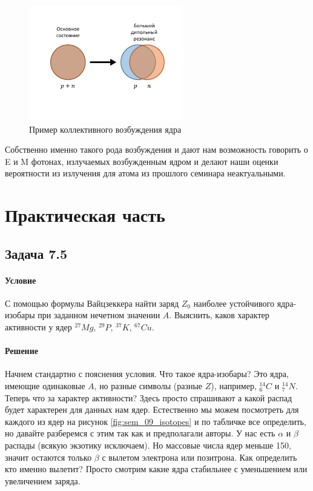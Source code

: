 \documentclass[12pt]{article}
\begin{document}
\begin{figure}[H]
    \centering
    \includegraphics[width=0.6\textwidth,keepaspectratio]{Seminar_09/pics/pic_dipole_resonance.pdf}
    \caption{Пример коллективного возбуждения ядра}
    \label{fig:sem_09_dipole_res}
\end{figure}
Собственно именно такого рода возбуждения и дают нам возможность говорить о E и M фотонах, излучаемых  возбужденным ядром и делают наши оценки вероятности из излучения для атома из прошлого семинара неактуальными.

\section{Практическая часть}
\subsection{Задача 7.5}
\label{task_}
\paragraph{Условие}
С помощью формулы Вайцзеккера найти заряд $Z_0$ наиболее устойчивого ядра-изобары при заданном нечетном значении $A$. Выяснить, каков характер активности у ядер $^{27}Mg$, $^{29}P$, $^{37}K$, $^{67}Cu$.
\paragraph{Решение}
Начнем стандартно с пояснения условия. Что такое ядра-изобары? Это ядра, имеющие одинаковые $A$, но разные символы (разные $Z$), например, $^{14}_6C$ и $ ^{14}_7N$. Теперь что за характер активности? Здесь просто спрашивают а какой распад будет характерен для данных нам ядер. Естественно мы можем посмотреть для каждого из ядер на рисунок \ref{fig:sem_09_isotopes} и по табличке все определить, но давайте разберемся с этим так как и предполагали авторы. У нас есть $\alpha$ и $\beta$ распады (всякую экзотику исключаем). Но массовые числа ядер меньше 150, значит остаются только $\beta$ с вылетом электрона или позитрона. Как определить кто именно вылетит? Просто смотрим какие ядра стабильнее с уменьшением или увеличением заряда. 
\end{document}
